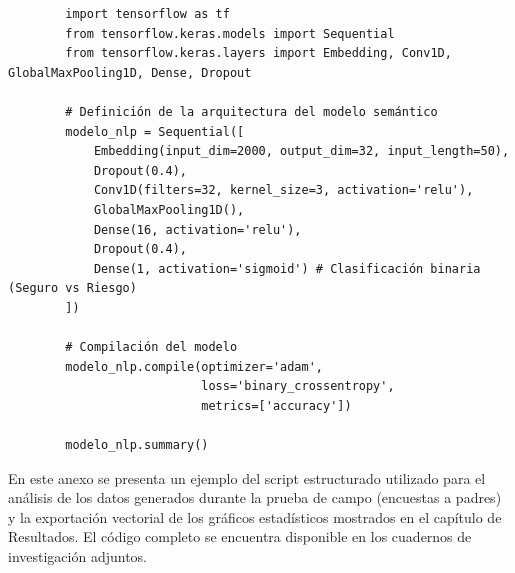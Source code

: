 \begin{listing}[H]
    \caption{Fragmento de código en Python para la generación y compilación del modelo \gls{nlp} Conv1D}
    \label{cod:anexo-modelo-nlp}
    \begin{verbatim}
        import tensorflow as tf
        from tensorflow.keras.models import Sequential
        from tensorflow.keras.layers import Embedding, Conv1D, GlobalMaxPooling1D, Dense, Dropout

        # Definición de la arquitectura del modelo semántico
        modelo_nlp = Sequential([
            Embedding(input_dim=2000, output_dim=32, input_length=50),
            Dropout(0.4),
            Conv1D(filters=32, kernel_size=3, activation='relu'),
            GlobalMaxPooling1D(),
            Dense(16, activation='relu'),
            Dropout(0.4),
            Dense(1, activation='sigmoid') # Clasificación binaria (Seguro vs Riesgo)
        ])

        # Compilación del modelo
        modelo_nlp.compile(optimizer='adam', 
                           loss='binary_crossentropy', 
                           metrics=['accuracy'])
        
        modelo_nlp.summary()
    \end{verbatim}
\end{listing}

\clearpage

\begin{tcolorbox}[colback=gray!5!white, colframe=gray!60!black, title=Anexo D \- Fragmento de código en Python para el análisis de datos de validación]
    En este anexo se presenta un ejemplo del script estructurado utilizado para el análisis de los datos generados durante la prueba de campo (encuestas a padres) y la exportación vectorial de los gráficos estadísticos mostrados en el capítulo de Resultados. El código completo se encuentra disponible en los cuadernos de investigación adjuntos.
\end{tcolorbox}

